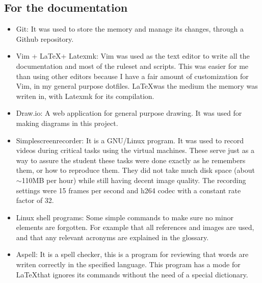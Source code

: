 \subsection{For the documentation}
\begin{itemize}
	\item Git: It was used to store the memory and manage its changes, through a Github repository\cite{memoria_github}.
	\item Vim + \LaTeX + Latexmk: Vim was used as the text editor to write all the documentation and most of the ruleset and scripts. This was easier for me than using other editors because I have a fair amount of customization for Vim, in my general purpose dotfiles\cite{andresgomezvidal_gitlab}. \LaTeX was the medium the memory was writen in, with Latexmk for its compilation.
	\item Draw.io: A web application for general purpose drawing\cite{drawio}. It was used for making diagrams in this project.
	\item Simplescreenrecorder: It is a GNU/Linux program. It was used to record videos during critical tasks using the virtual machines. These serve just as a way to assure the student these tasks were done exactly as he remembers them, or how to reproduce them.
	They did not take much disk space (about $\sim$110MB per hour) while still having decent image quality. The recording settings were 15 frames per second and h264 codec with a constant rate factor of 32.
	\item Linux shell programs: Some simple commands to make sure no minor elements are forgotten. For example that all references and images are used, and that any relevant acronyms are explained in the glossary.
	\item Aspell: It is a spell checker\cite{aspell}, this is a program for reviewing that words are writen correctly in the specified language. This program has a mode for \LaTeX that ignores its commands without the need of a special dictionary.
\end{itemize}

